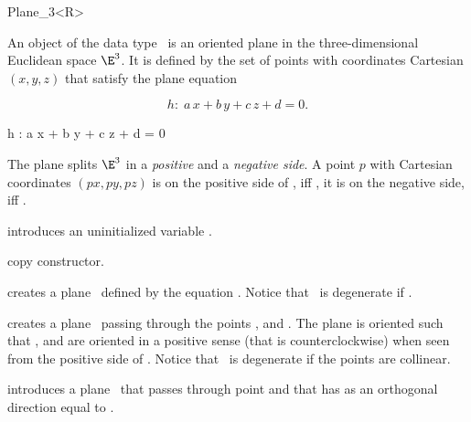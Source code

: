 \begin{ccRefClass} {Plane_3<R>}

\ccDefinition
An object  of the data type \ccRefName\ is an oriented
plane in the three-dimensional Euclidean space $\E^3$. It is defined
by the set of points with coordinates Cartesian $(x,y,z)$ that satisfy 
the plane equation 

\begin{ccTexOnly}
\[h :\;  a\, x +b\, y +c\, z + d = 0.\]
\end{ccTexOnly}
\begin{ccHtmlOnly}
h : a x + b y + c z + d = 0
\end{ccHtmlOnly}

The plane splits $\E^3$ in a {\em positive} and a {\em negative
side}. 
A point $p$ with Cartesian coordinates $(px, py, pz)$ is on the positive side of
, iff , it is on the
negative side, iff .



\ccCreation
{}


\ccHidden {}
             {introduces an uninitialized variable \ccVar.}

\ccHidden {}
 	    {copy constructor.}

{creates a plane \ccVar\ defined by the equation
 .
Notice that \ccVar\ is degenerate if .}

{creates a plane \ccVar\ passing through the points ,
  and . The plane is oriented such that , 
  and  are oriented in a positive sense 
 (that is counterclockwise) when seen from the positive side of \ccVar.
Notice that \ccVar\ is degenerate if the points are collinear.}


{introduces a plane \ccVar\ that passes through point  and
 that has as an orthogonal direction equal to .}


\end{ccRefClass}
